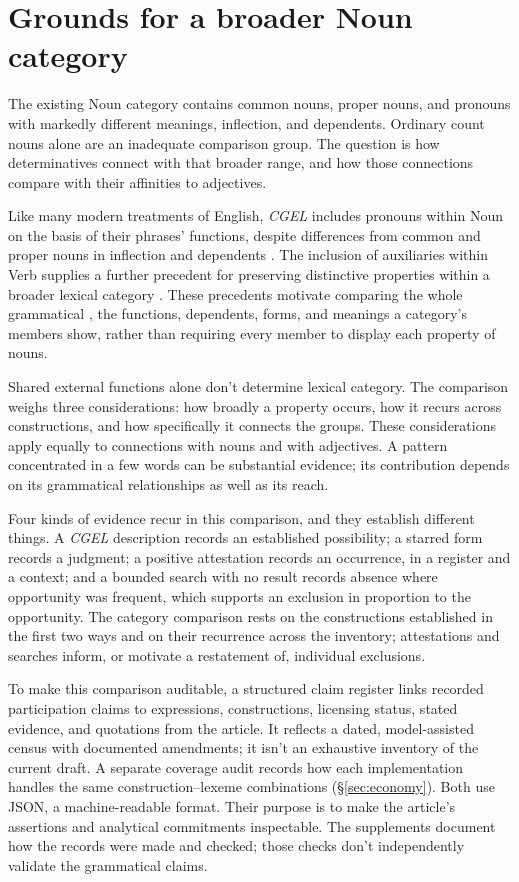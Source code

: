 \documentclass[12pt]{article}
\begin{document}
\section{Grounds for a broader Noun category}\label{sec:proposal}

The existing Noun category contains common nouns, proper nouns, and pronouns with markedly different meanings, inflection, and dependents. Ordinary count nouns alone are an inadequate comparison group. The question is how determinatives connect with that broader range, and how those connections compare with their affinities to adjectives.

Like many modern treatments of English, \textit{CGEL} includes pronouns within Noun on the basis of their phrases' functions, despite differences from common and proper nouns in inflection and dependents \citep[327--328]{huddleston2002}. The inclusion of auxiliaries within Verb supplies a further precedent for preserving distinctive properties within a broader lexical category \citep{pullumwilson1977}. These precedents motivate comparing the whole grammatical , the functions, dependents, forms, and meanings a category's members show, rather than requiring every member to display each property of nouns.

Shared external functions alone don't determine lexical category. The comparison weighs three considerations: how broadly a property occurs, how it recurs across constructions, and how specifically it connects the groups. These considerations apply equally to connections with nouns and with adjectives. A pattern concentrated in a few words can be substantial evidence; its contribution depends on its grammatical relationships as well as its reach.

Four kinds of evidence recur in this comparison, and they establish different things. A \textit{CGEL} description records an established possibility; a starred form records a judgment; a positive attestation records an occurrence, in a register and a context; and a bounded search with no result records absence where opportunity was frequent, which supports an exclusion in proportion to the opportunity. The category comparison rests on the constructions established in the first two ways and on their recurrence across the inventory; attestations and searches inform, or motivate a restatement of, individual exclusions.

To make this comparison auditable, a structured claim register links recorded participation claims to expressions, constructions, licensing status, stated evidence, and quotations from the article. It reflects a dated, model-assisted census with documented amendments; it isn't an exhaustive inventory of the current draft. A separate coverage audit records how each implementation handles the same construction--lexeme combinations (§\ref{sec:economy}). Both use JSON, a machine-readable format. Their purpose is to make the article's assertions and analytical commitments inspectable. The supplements document how the records were made and checked; those checks don't independently validate the grammatical claims.
\end{document}
